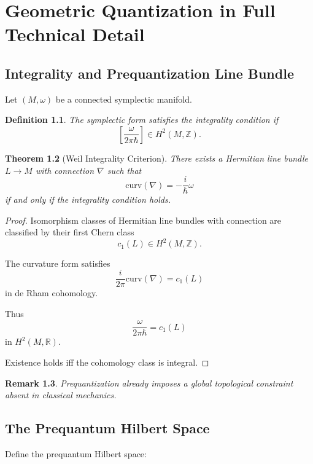\documentclass[11pt]{book}
\newtheorem{theorem}{Theorem}[chapter]
\newtheorem{definition}[theorem]{Definition}
\newtheorem{remark}[theorem]{Remark}
\begin{document}
\chapter{Geometric Quantization in Full Technical Detail}

\section{Integrality and Prequantization Line Bundle}

Let $(M,\omega)$ be a connected symplectic manifold.

\begin{definition}
The symplectic form satisfies the \emph{integrality condition} if
\[
\left[ \frac{\omega}{2\pi\hbar} \right] \in H^2(M,\mathbb{Z}).
\]
\end{definition}

\begin{theorem}[Weil Integrality Criterion]
There exists a Hermitian line bundle $L \to M$
with connection $\nabla$
such that
\[
\mathrm{curv}(\nabla) = -\frac{i}{\hbar}\omega
\]
if and only if the integrality condition holds.
\end{theorem}

\begin{proof}
Isomorphism classes of Hermitian line bundles with connection
are classified by their first Chern class
\[
c_1(L) \in H^2(M,\mathbb{Z}).
\]

The curvature form satisfies
\[
\frac{i}{2\pi} \mathrm{curv}(\nabla)
=
c_1(L)
\]
in de Rham cohomology.

Thus
\[
\frac{\omega}{2\pi\hbar}
=
c_1(L)
\]
in $H^2(M,\mathbb{R})$.

Existence holds iff the cohomology class is integral.
\end{proof}

\begin{remark}
Prequantization already imposes a global topological constraint
absent in classical mechanics.
\end{remark}

\section{The Prequantum Hilbert Space}

Define the prequantum Hilbert space:
\end{document}
